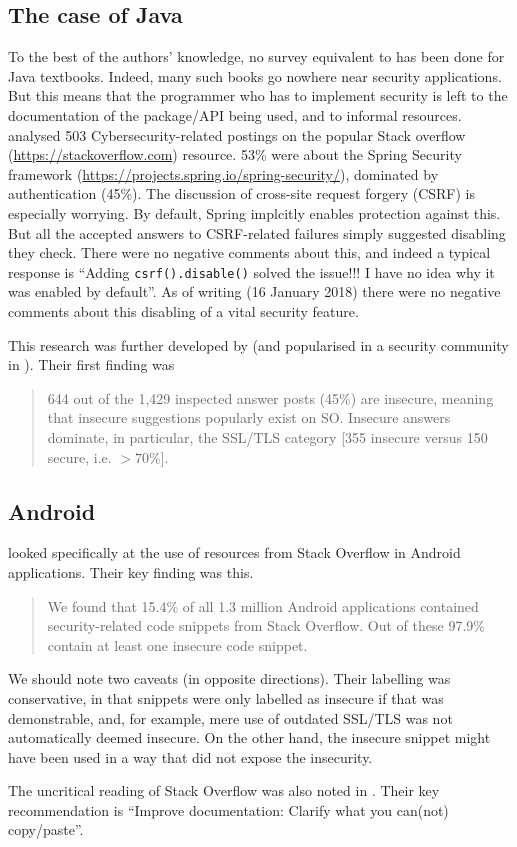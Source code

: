 \documentclass[conference]{IEEEtran}
\begin{document}
\subsection{The case of Java}\label{sec:Java}
To the best of the authors' knowledge, no survey equivalent to \cite{Drop2019} has been done for Java textbooks. Indeed, many such books go nowhere near security applications.  But this means that the programmer who has to implement security is left to the documentation of the package/API being used, and to informal resources. \cite{Mengetal2018a} analysed 503 Cybersecurity-related postings on the popular Stack overflow (\url{https://stackoverflow.com}) resource.  53\% were about the Spring Security framework (\url{https://projects.spring.io/spring-security/}), dominated by authentication (45\%). The discussion \cite[\S4.3.1]{Mengetal2018a} of cross-site request forgery (CSRF) is especially worrying.  By default, Spring implcitly enables protection against this. But all the accepted answers to CSRF-related failures simply suggested disabling they check. There were no negative comments about this, and indeed a typical response is ``Adding \verb!csrf().disable()!
solved the issue!!! I have no idea why it was enabled by default''. As of writing (16 January 2018) there were no negative comments about this disabling of a vital security feature.
\par
This research was further developed by \cite{Chenetal2019a}  (and popularised in a security community in \cite{Zorz2019a}). Their first finding was
\begin{quote}
644 out of the 1,429 inspected answer posts
(45\%) are insecure, meaning that insecure suggestions
popularly exist on SO. Insecure answers dominate, in
particular, the SSL/TLS category [355 insecure versus 150 secure, i.e. $>70$\%].
\end{quote} 

\subsection{Android}\label{sec:Android}
\cite{Fischeretal2017a} looked specifically at the use of resources from Stack Overflow in Android applications. Their key finding was this.
\begin{quote}
We found that 15.4\% of all 1.3 million Android applications
contained security-related code snippets from
Stack Overflow. Out of these 97.9\% contain at least one
insecure code snippet.
\end{quote}
We should note two caveats (in opposite directions). Their labelling was conservative, in that snippets were only labelled as insecure if that was demonstrable, and, for example, mere use of outdated SSL/TLS was not automatically deemed insecure. On the other hand, the insecure snippet might have been used in a way that did not expose the insecurity.
\par
The uncritical reading of Stack Overflow was also noted in \cite[Slide 29]{Votipkaetal2019a}. Their key recommendation  \cite[Slide 32]{Votipkaetal2019a} is ``Improve documentation: Clarify what you can(not) copy/paste''. 
\end{document}
